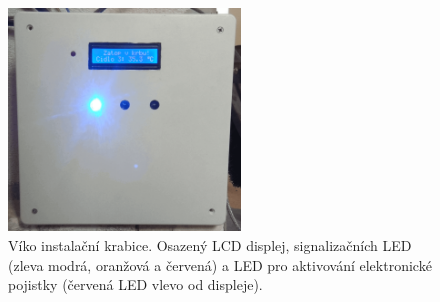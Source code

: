 \begin{figure}[H]
    \centering
    \includegraphics[width=0.55\textwidth]{images/krb/predni-cast-krytu-vika-instalacni-krabice-krb.png}
    \caption[Víko instalační krabice.]{Víko instalační krabice. Osazený LCD displej, signalizačních LED (zleva modrá, oranžová a červená) a LED pro aktivování elektronické pojistky (červená LED vlevo od displeje).}
    \label{fig:predni-cast-krytu-vika-instalacni-krabice-krb}
\end{figure}


